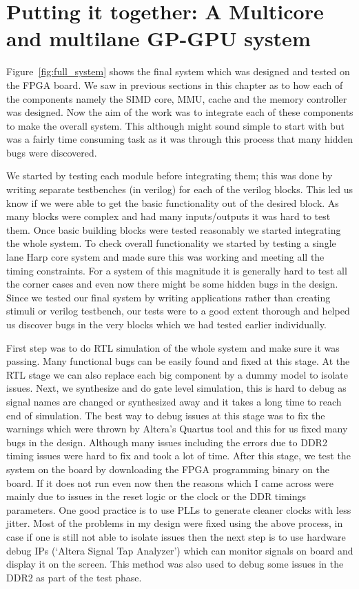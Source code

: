 \section{Putting it together: A Multicore and multilane GP-GPU system}
Figure~\ref{fig:full_system} shows the final system which was designed and tested on the FPGA board. We saw in previous sections in this chapter as to how each of the components namely the SIMD core, MMU, cache and the memory controller was designed. Now the aim of the work was to integrate each of these components to make the overall system. This although might sound simple to start with but was a fairly time consuming task as it was through this process that many hidden bugs were discovered. 

We started by testing each module before integrating them; this was done by writing separate testbenches (in verilog) for each of the verilog blocks. This led us know if we were able to get the basic functionality out of the desired block. As many blocks were complex and had many inputs/outputs it was hard to test them. Once basic building blocks were tested reasonably we started integrating the whole system. To check overall functionality we started by testing a single lane Harp core system and made sure this was working and meeting all the timing constraints. For a system of this magnitude it is generally hard to test all the corner cases and even now there might be some hidden bugs in the design. Since we tested our final system by writing applications rather than creating stimuli or verilog testbench, our tests were to a good extent thorough and helped us discover bugs in the very blocks which we had tested earlier individually.

First step was to do RTL simulation of the whole system and make sure it was passing. Many functional bugs can be easily found and fixed at this stage. At the RTL stage we can also replace each big component by a dummy model to isolate issues. Next, we synthesize and do gate level simulation, this is hard to debug as signal names are changed or synthesized away and it takes a long time to reach end of simulation. The best way to debug issues at this stage was to fix the warnings which were thrown by Altera's Quartus tool and this for us fixed many bugs in the design. Although many issues including the errors due to DDR2 timing issues were hard to fix and took a lot of time. After this stage, we test the system on the board by downloading the FPGA programming binary on the board. If it does not run even now then the reasons which I came across were mainly due to issues in the reset logic or the clock or the DDR timings parameters. One good practice is to use PLLs to generate cleaner clocks with less jitter. Most of the problems in my design were fixed using the above process, in case if one is still not able to isolate issues then the next step is to use hardware debug IPs (`Altera Signal Tap Analyzer') which can monitor signals on board and display it on the screen. This method was also used to debug some issues in the DDR2 as part of the test phase.


